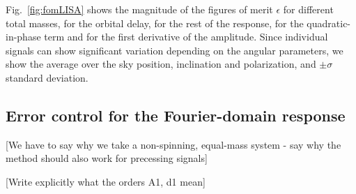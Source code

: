 \documentclass[aps,showpacs,twocolumn,
prd,superscriptaddress,nofootinbib]{revtex4-1}
\newcommand{\SM}[1]{{\color{Red} #1}}
\begin{document}
Fig.~\ref{fig:fomLISA} shows the magnitude of the figures of merit $\epsilon$ for different total masses, for the orbital delay, for the rest of the response, for the quadratic-in-phase term and for the first derivative of the amplitude. Since individual signals can show significant variation depending on the angular parameters, we show the average over the sky position, inclination and polarization, and $\pm \sigma$ standard deviation.


\subsection{Error control for the Fourier-domain response}
\label{subsec:errorsLISA}

\SM{[We have to say why we take a non-spinning, equal-mass system - say why the method should also work for precessing signals]}

\SM{[Write explicitly what the orders A1, d1 mean]}
\end{document}
